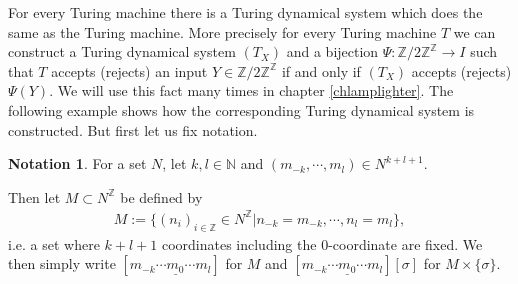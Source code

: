 \documentclass[12pt,a4paper]{scrartcl}
\theoremstyle{plain}
\theoremstyle{definition}
\newtheorem{Notation}[Theorem]{Notation}
\newcommand{\Z}{\mathbb{Z}} %
\newcommand{\N}{\mathbb{N}} %
\newcommand{\2}{\mathbb{Z} / 2 \mathbb{Z}}
\newcommand{\1}{\bar{1}}
\newcommand{\0}{\bar{0}}
\begin{document}
For every Turing machine there is a Turing dynamical system which does the same as the Turing machine. More precisely for every Turing machine $T$ we can construct a Turing dynamical system $(T_X)$ and a bijection $\Psi\colon\2^\Z \to I$ such that $T$ accepts (rejects) an input $Y \in \2^\Z$ if and only if $(T_X)$ accepts (rejects) $\Psi(Y)$. We will use this fact many times in chapter \ref{chlamplighter}. The following example shows how the corresponding Turing dynamical system is constructed. But first let us fix notation.
\begin{Notation} \label{notation_TM}
	For a set $N$, let $k,l \in \N$ and $ (m_{-k}, \cdots,  m_l) \in N^{k+l+1}$. 
	
	Then let $M \subset N^\Z$  be defined by 
	\begin{align*}
		M := \{(n_i)_{i \in \Z} \in N^\Z | n_{-k} = m_{-k}, \cdots, n_l = m_l \},
	\end{align*}
	i.e. a set where $k+l +1$ coordinates including the $0$-coordinate are fixed. We then simply write $[m_{-k} \cdots \underline{m_0} \cdots m_l]$ for $M$ and $[m_{-k} \cdots \underline{m_0} \cdots m_l][\sigma]$ for $M \times \{\sigma\}$.
\end{Notation}
\end{document}
